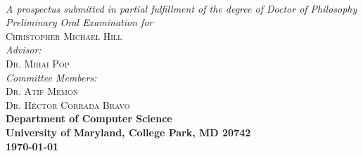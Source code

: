 \documentclass{article}
\begin{document}
 




\begin{titlepage}
\begin{center}

\textsc{\huge \bfseries {}}\\
 
\emph{A prospectus submitted in partial fulfillment of the degree of Doctor of
Philosophy}\\[5.5cm]


\emph{Preliminary Oral Examination for}\\
\textsc{\large Christopher Michael Hill}\\[2.0cm] %
\emph{Advisor:} \\
\textsc{Dr. Mihai Pop}\\[.5cm]
\emph{Committee Members:}\\
\textsc{Dr. Atif Memon}\\
\textsc{Dr. H\'ector Corrada Bravo}\\[4.0cm]

{\bfseries Department of Computer Science}\\
{\bfseries University of Maryland, College Park, MD 20742}\\
{\bfseries \mydate\today}
\vfill

\end{center}
\end{titlepage}

\newpage
\thispagestyle{empty}
\mbox{}
\end{document}
